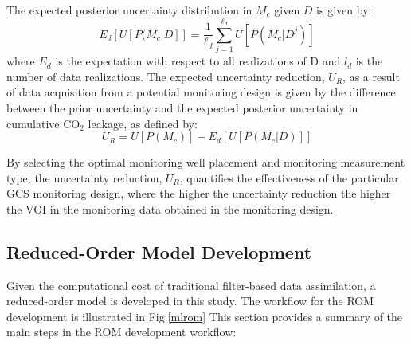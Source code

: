 \documentclass[a4paper,fleqn]{cas-sc}
\begin{document}
The expected posterior uncertainty distribution in $M_c$ given $D$ is given by:
\begin{equation} \label{eq:2}
    E_d [U [ P(M_c \vert D]] = \frac{1}{\ell_d} \sum_{j=1}^{\ell_d} U [P (M_c \vert D^j) ]
\end{equation}
where $E_d$ is the expectation with respect to all realizations of D and $l_d$ is the number of data realizations. The expected uncertainty reduction, $U_R$, as a result of data acquisition from a potential monitoring design is given by the difference between the prior uncertainty and the expected posterior uncertainty in cumulative CO$_2$ leakage, as defined by:
\begin{equation} \label{eq:3}
    U_R = U[P(M_c)] - E_d [U [ P(M_c \vert D)]]
\end{equation}

By selecting the optimal monitoring well placement and monitoring measurement type, the uncertainty reduction, $U_R$, quantifies the effectiveness of the particular GCS monitoring design, where the higher the uncertainty reduction the higher the VOI in the monitoring data obtained in the monitoring design.

\subsection{Reduced-Order Model Development}
Given the computational cost of traditional filter-based data assimilation, a reduced-order model is developed in this study. The workflow for the ROM development is illustrated in Fig.\ref{mlrom} This section provides a summary of the main steps in the ROM development workflow:
\end{document}
